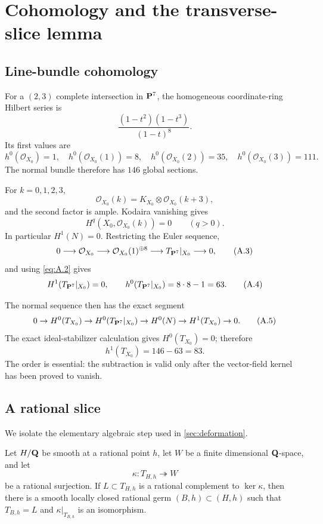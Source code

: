 \section{Cohomology and the transverse-slice lemma}
\label{app:cohomology}

\subsection{Line-bundle cohomology}

For a \((2,3)\) complete intersection in \(\mathbf P^7\), the homogeneous
coordinate-ring Hilbert series is
\[
 \frac{(1-t^2)(1-t^3)}{(1-t)^8}.
\]
Its first values are
\[
 h^0(\mathcal O_{X_0})=1,\quad
 h^0(\mathcal O_{X_0}(1))=8,\quad
 h^0(\mathcal O_{X_0}(2))=35,\quad
 h^0(\mathcal O_{X_0}(3))=111.                    \tag{A.1}
\]
The normal bundle therefore has \(146\) global sections.

For \(k=0,1,2,3\),
\[
 \mathcal O_{X_0}(k)
 =K_{X_0}\otimes\mathcal O_{X_0}(k+3),
\]
and the second factor is ample.  Kodaira vanishing gives
\[
 H^q(X_0,\mathcal O_{X_0}(k))=0\qquad(q>0).
 \tag{A.2}
\label{eq:A.2}
\]
In particular \(H^1(N)=0\).  Restricting the Euler sequence,
\[
 0\longrightarrow\mathcal O_{X_0}
 \longrightarrow\mathcal O_{X_0}(1)^{\oplus8}
 \longrightarrow T_{\mathbf P^7}|_{X_0}
 \longrightarrow0,                                 \tag{A.3}
\]
and using \cref{eq:A.2} gives
\[
 H^1(T_{\mathbf P^7}|_{X_0})=0,\qquad
 h^0(T_{\mathbf P^7}|_{X_0})=8\cdot8-1=63.              \tag{A.4}
\]

The normal sequence then has the exact segment
\[
\begin{aligned}
0\to H^0(T_{X_0})\to H^0(T_{\mathbf P^7}|_{X_0})
\to H^0(N)\to H^1(T_{X_0})\to0.
\end{aligned}                                      \tag{A.5}
\]
The exact ideal-stabilizer calculation gives \(H^0(T_{X_0})=0\);
therefore
\[
 h^1(T_{X_0})=146-63=83.                           \tag{A.6}
\]
The order is essential: the subtraction is valid only after the
vector-field kernel has been proved to vanish.

\subsection{A rational slice}

We isolate the elementary algebraic step used in
\cref{sec:deformation}.

\begin{lemma}
\label{lem:rational-slice}
Let \(H/\mathbf Q\) be smooth at a rational point \(h\), let \(W\) be a finite
dimensional \(\mathbf Q\)-space, and let
\[
 \kappa:T_{H,h}\twoheadrightarrow W
\]
be a rational surjection.  If \(L\subset T_{H,h}\) is a rational complement
to \(\ker\kappa\), then there is a smooth locally closed rational germ
\((B,h)\subset(H,h)\) such that \(T_{B,h}=L\) and
\(\kappa|_{T_{B,h}}\) is an isomorphism.
\end{lemma}

